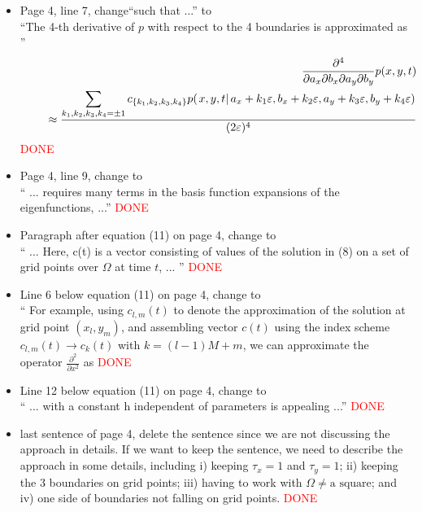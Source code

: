 \documentclass[12pt]{article}
\begin{document}
\begin{itemize}
\item Page 4, line 7, change``such that ...'' to \\
``The 4-th derivative of $p$ with respect to the 4 boundaries is approximated as '' \\
\begin{eqnarray} 
& & \frac{\partial^4}{\partial a_x \partial b_x \partial a_y \partial b_y} p(x, y, t) 
\nonumber \\
& & \hspace*{0.5cm} \approx \frac{\displaystyle \sum_{k_1, k_2, k_3, k_4 = \pm 1}
c_{\{ k_1, k_2, k_3, k_4 \} } p(\left. x, y, t \right| a_x+k_1 \varepsilon, b_x+k_2 \varepsilon, 
a_y+k_3 \varepsilon, b_y+k_4 \varepsilon) }{(2 \varepsilon )^4} 
\nonumber
\end{eqnarray}
\textcolor{red}{DONE}

\item Page 4, line 9, change to \\
  `` ... requires many terms in the basis function expansions of the eigenfunctions, ...''
  \textcolor{red}{DONE}

\item Paragraph after equation (11) on page 4, change to \\
`` ... Here, c(t) is a vector consisting of values of the solution in (8) on a set of grid points
over $\Omega$ at time $t$, ... ''
  \textcolor{red}{DONE}

\item Line 6 below equation (11) on page 4, change to \\
`` For example, using $c_{l, m}(t) $ 
to denote the approximation of the solution at grid point $(x_l, y_m)$, and assembling 
vector $c(t)$ using the index scheme $c_{l, m}(t) \rightarrow c_k(t)$ with  
$k=  (l-1) M + m$, we can approximate the operator $\frac{\partial^2 }{\partial x^2} $ as
  \textcolor{red}{DONE}

\item Line 12 below equation (11) on page 4, change to \\
  `` ... with a constant h independent of parameters is appealing ...''
    \textcolor{red}{DONE}

\item last sentence of page 4, delete the sentence since we are not discussing 
the approach in details. If we want to keep the sentence, we need to describe the approach
in some details, including i) keeping $\tau_x =1$ and 
$\tau_y = 1$; ii) keeping the 3 boundaries on grid points; iii) having to work with 
$\Omega \ne \mbox{a square}$; and iv) one side of boundaries not falling on grid points.
    \textcolor{red}{DONE}


\end{itemize}
\end{document}

